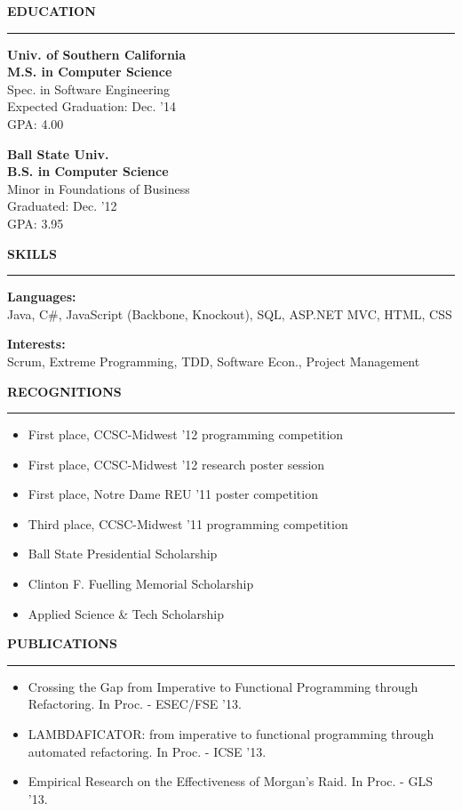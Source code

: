 \documentclass[a4paper,10pt]{article}
\newcommand{\header}[1]
{
{\Large \textbf {\uppercase{#1}}}
\vspace{0.05in}
\hrule
\vspace{0.15in}
}
\newcommand{\spacer}{\vspace*{1\baselineskip}}
\newenvironment{details}
{\begin{itemize}[label=\scalebox{.5}{\ding{117}},leftmargin=0.15in]}
{\end{itemize}}
\begin{document}
\begin{minipage}[t]{0.35\textwidth}
\header{Education}

\textbf{Univ. of Southern California\\
M.S. in Computer Science\\}
Spec. in Software Engineering\\
Expected Graduation: Dec. '14\\
GPA: 4.00
\spacer

\textbf{Ball State Univ.\\
B.S. in Computer Science\\}
Minor in Foundations of Business\\
Graduated: Dec. '12\\
GPA: 3.95

\spacer

\header{Skills}

\textbf{Languages:}\\
Java, C\#, JavaScript (Backbone, Knockout), SQL, ASP.NET MVC, HTML, CSS

\spacer

\textbf{Interests:}\\
Scrum, Extreme Programming, TDD, Software Econ., Project Management

\spacer

\header{Recognitions}

\vspace{-0.1in}
\begin{details}
  \item First place, CCSC-Midwest '12 programming competition
  \item First place, CCSC-Midwest '12 research poster session
  \item First place, Notre Dame REU '11 poster competition
  \item Third place, CCSC-Midwest '11 programming competition
  \item Ball State Presidential Scholarship
  \item Clinton F. Fuelling Memorial Scholarship
  \item Applied Science \& Tech Scholarship
\end{details}
\vspace{-0.1in}

\spacer

\header{Publications}

\vspace{-0.1in}
\begin{details}
  \item
  Crossing the Gap from Imperative to Functional Programming through Refactoring.
  In Proc. - ESEC/FSE '13.
  
  \item 
  LAMBDAFICATOR: from imperative to functional programming through automated refactoring. 
  In Proc. - ICSE '13.
  
  \item
  Empirical Research on the Effectiveness of Morgan's Raid.
  In Proc. - GLS '13.
\end{details}
\vspace{-0.1in}

\end{minipage}
\end{document}
